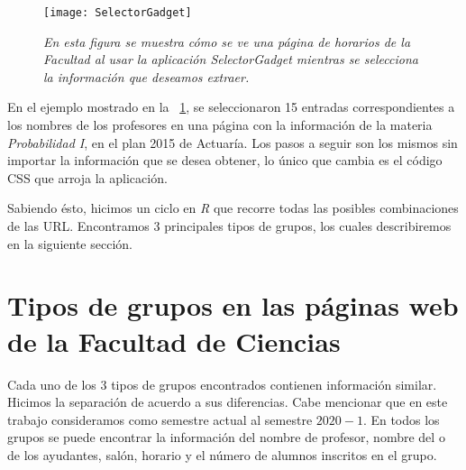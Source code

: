 \begin{figure}[H]
\centering
\texttt{[image: SelectorGadget]} %
\caption[\textit{Uso de la aplicación SelectorGadget}]{\textit{En esta figura se muestra cómo se ve una página de horarios de la Facultad al usar la aplicación SelectorGadget mientras se selecciona la información que deseamos extraer.}}\label{appSelectorGadget}
\end{figure}

En el ejemplo mostrado en la \figurename{~\ref{appSelectorGadget}}, se seleccionaron 15 entradas correspondientes a los nombres de los profesores en una página con la información de la materia \textit{Probabilidad I}, en el plan 2015 de Actuaría. Los pasos a seguir son los mismos sin importar la información que se desea obtener, lo único que cambia es el código CSS que arroja la aplicación.

Sabiendo ésto, hicimos un ciclo en \textit{R} que recorre todas las posibles combinaciones de las URL. Encontramos 3 principales tipos de grupos, los cuales describiremos en la siguiente sección.
  
  
  \section{Tipos de grupos en las páginas web de la Facultad de Ciencias} \label{TiposDeGpos}
  
  Cada uno de los 3 tipos de grupos encontrados contienen información similar. Hicimos la separación de acuerdo a sus diferencias. Cabe mencionar que en este trabajo consideramos como semestre actual al semestre $2020-1$. En todos los grupos se puede encontrar la información del nombre de profesor, nombre del o de los ayudantes, salón, horario y el número de alumnos inscritos en el grupo.
  
